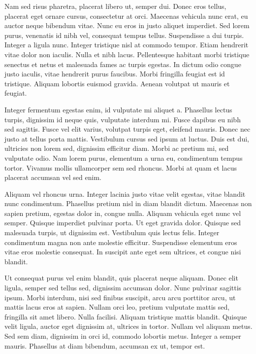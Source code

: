 Nam sed risus pharetra, placerat libero ut, semper dui. Donec eros tellus, placerat eget ornare cursus, consectetur at orci. Maecenas vehicula nunc erat, eu auctor neque bibendum vitae. Nunc eu eros in justo aliquet imperdiet. Sed lorem purus, venenatis id nibh vel, consequat tempus tellus. Suspendisse a dui turpis. Integer a ligula nunc. Integer tristique nisl at commodo tempor. Etiam hendrerit vitae dolor non iaculis. Nulla et nibh lacus. Pellentesque habitant morbi tristique senectus et netus et malesuada fames ac turpis egestas. In dictum odio congue justo iaculis, vitae hendrerit purus faucibus. Morbi fringilla feugiat est id tristique. Aliquam lobortis euismod gravida. Aenean volutpat ut mauris et feugiat.

Integer fermentum egestas enim, id vulputate mi aliquet a. Phasellus lectus turpis, dignissim id neque quis, vulputate interdum mi. Fusce dapibus eu nibh sed sagittis. Fusce vel elit varius, volutpat turpis eget, eleifend mauris. Donec nec justo at tellus porta mattis. Vestibulum cursus sed ipsum at luctus. Duis est dui, ultricies non lorem sed, dignissim efficitur diam. Morbi ac pretium mi, sed vulputate odio. Nam lorem purus, elementum a urna eu, condimentum tempus tortor. Vivamus mollis ullamcorper sem sed rhoncus. Morbi at quam et lacus placerat accumsan vel sed enim.

Aliquam vel rhoncus urna. Integer lacinia justo vitae velit egestas, vitae blandit nunc condimentum. Phasellus pretium nisl in diam blandit dictum. Maecenas non sapien pretium, egestas dolor in, congue nulla. Aliquam vehicula eget nunc vel semper. Quisque imperdiet pulvinar porta. Ut eget gravida dolor. Quisque sed malesuada turpis, ut dignissim est. Vestibulum quis lectus felis. Integer condimentum magna non ante molestie efficitur. Suspendisse elementum eros vitae eros molestie consequat. In suscipit ante eget sem ultrices, et congue nisi blandit.

Ut consequat purus vel enim blandit, quis placerat neque aliquam. Donec elit ligula, semper sed tellus sed, dignissim accumsan dolor. Nunc pulvinar sagittis ipsum. Morbi interdum, nisi sed finibus suscipit, arcu arcu porttitor arcu, ut mattis lacus eros at sapien. Nullam orci leo, pretium vulputate mattis sed, fringilla sit amet libero. Nulla facilisi. Aliquam tristique mattis blandit. Quisque velit ligula, auctor eget dignissim at, ultrices in tortor. Nullam vel aliquam metus. Sed sem diam, dignissim in orci id, commodo lobortis metus. Integer a semper mauris. Phasellus at diam bibendum, accumsan ex ut, tempor est.

